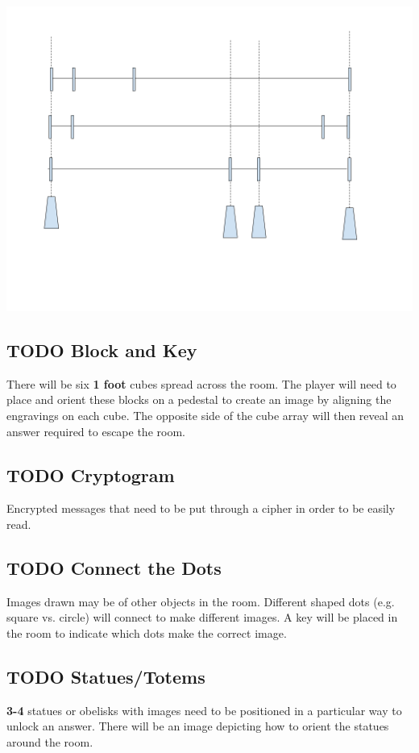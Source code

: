 \documentclass[11pt]{article}
\begin{document}
\begin{center}
\includegraphics[width=.9\linewidth]{./img/pt-rc-001.png}
\end{center}

\subsection{{\bfseries\sffamily TODO} Block and Key}
\label{sec:org2a1562b}
There will be six \textbf{1 foot} cubes spread across the room. The player will need to place and orient these blocks on a pedestal to create an image by aligning the engravings on each cube. The opposite side of the cube array will then reveal an answer required to escape the room.

\subsection{{\bfseries\sffamily TODO} Cryptogram}
\label{sec:org2f33a5e}
Encrypted messages that need to be put through a cipher in order to be easily read.

\subsection{{\bfseries\sffamily TODO} Connect the Dots}
\label{sec:org61f77b5}
Images drawn may be of other objects in the room. Different shaped dots (e.g. square vs. circle) will connect to make different images. A key will be placed in the room to indicate which dots make the correct image.

\subsection{{\bfseries\sffamily TODO} Statues/Totems}
\label{sec:org64a7339}
\textbf{3-4} statues or obelisks with images need to be positioned in a particular way to unlock an answer. There will be an image depicting how to orient the statues around the room.
\end{document}
